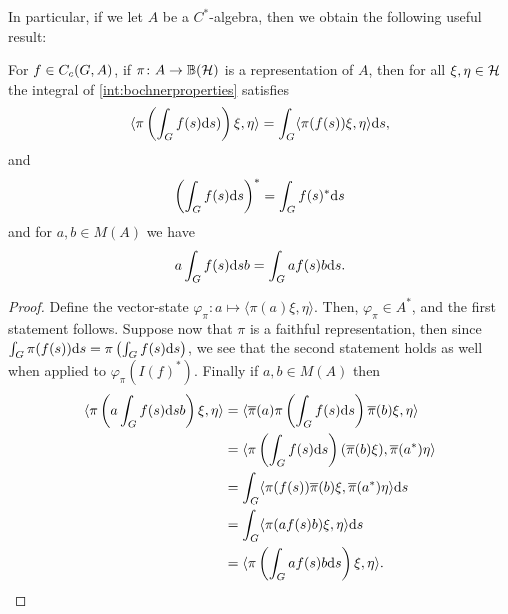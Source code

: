 In particular, if we let $A$ be a $C^*$-algebra, then we obtain the following useful result:
\begin{proposition}
For $f \in C_c(G,A)$, if $\pi \colon A \to \mathbb{B}(\mathcal{H})$ is a representation of $A$, then for all $\xi , \eta \in \mathcal{H}$ the integral of \ref{int:bochnerproperties} satisfies
\begin{align*}
	\langle \pi\left( \int_G f(s) \mathrm{d} s ) \right) \xi , \eta \rangle = \int_{G} \langle \pi(f(s)) \xi , \eta \rangle \mathrm{d} s,
\end{align*}
and 
\begin{align*}
	\left( \int_G f(s) \mathrm{d} s  \right)^* = \int_G f(s)^* \mathrm{d} s
\end{align*}
and for $a , b \in M(A)$ we have
\begin{align*}
 a \int_G f(s) \mathrm{d} s b = \int_G a f(s) b \mathrm{d} s.		
\end{align*}
\label{int:cstarint}
\end{proposition}
\begin{proof}
Define the vector-state $\varphi_\pi \colon a \mapsto \langle \pi(a) \xi , \eta \rangle$. Then, $\varphi_\pi \in A^*$, and the first statement follows. Suppose now that $\pi$ is a faithful representation, then since $\int_G \pi(f(s)) \mathrm{d} s = \pi \left( \int_Gf(s) \mathrm{d} s \right)$, we see that the second statement holds as well when applied to $\varphi_\pi(I(f)^*)$. Finally if $a,b \in M(A)$ then
\begin{align*}
	\langle \pi\left(a \int_G f(s) \mathrm{d} s b \right) \xi , \eta \rangle &= \langle \overline \pi(a) \pi\left( \int_G f(s) \mathrm{d} s \right) \overline \pi (b)  \xi , \eta \rangle \\
	 &= \langle \pi \left( \int_G f(s) \mathrm{d} s \right) (\overline \pi (b) \xi ) , \overline \pi(a^*) \eta \rangle \\ 
	 &= \int_G \langle \pi(f(s)) \overline \pi (b) \xi , \overline \pi(a ^* ) \eta \rangle \mathrm{d} s\\
	 &= \int_G \langle \pi(af(s)b) \xi , \eta \rangle \mathrm{d} s\\
	 &= \langle \pi \left(  \int_G a f(s) b \mathrm{d} s  \right) \xi , \eta \rangle.
\end{align*}
\end{proof}

